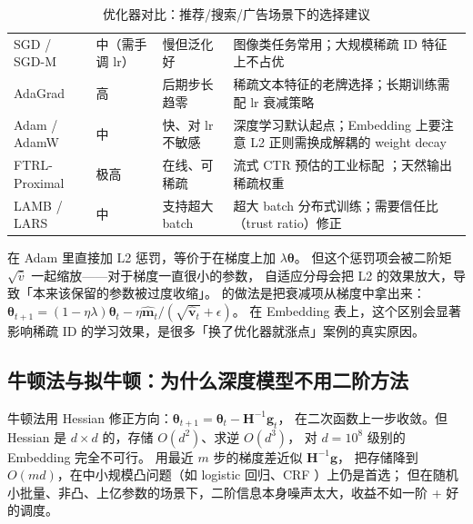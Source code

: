 \begin{table}[htbp]
\centering
\caption{优化器对比：推荐/搜索/广告场景下的选择建议}
\label{tab:optimizers}
\small
\begin{tabularx}{\textwidth}{L{2.0cm} L{2.4cm} L{3.0cm} Y}
\toprule
{} &  &  &  \\
\midrule
SGD / SGD-M & 中（需手调 lr） & 慢但泛化好 & 图像类任务常用；大规模稀疏 ID 特征上不占优 \\
\addlinespace
AdaGrad & 高 & 后期步长趋零 & 稀疏文本特征的老牌选择；长期训练需配 lr 衰减策略 \\
\addlinespace
Adam / AdamW & 中 & 快、对 lr 不敏感 & 深度学习默认起点；Embedding 上要注意 L2 正则需换成解耦的 weight decay \\
\addlinespace
FTRL-Proximal & 极高 & 在线、可稀疏 & 流式 CTR 预估的工业标配 \cite{mcmahan2013ftrl}；天然输出稀疏权重 \\
\addlinespace
LAMB / LARS & 中 & 支持超大 batch & 超大 batch 分布式训练；需要信任比（trust ratio）修正 \\
\bottomrule
\end{tabularx}
\end{table}

\begin{insight}
在 Adam 里直接加 L2 惩罚，等价于在梯度上加 $\lambda\bm{\theta}$。
但这个惩罚项会被二阶矩 $\sqrt{\hat{v}}$ 一起缩放——对于梯度一直很小的参数，
自适应分母会把 L2 的效果放大，导致「本来该保留的参数被过度收缩」。
 的做法是把衰减项从梯度中拿出来：
$\bm{\theta}_{t+1} = (1-\eta\lambda)\bm{\theta}_t - \eta \hat{\bm{m}}_t/(\sqrt{\hat{\bm{v}}_t}+\epsilon)$。
在 Embedding 表上，这个区别会显著影响稀疏 ID 的学习效果，是很多「换了优化器就涨点」案例的真实原因。
\end{insight}

\subsection{牛顿法与拟牛顿：为什么深度模型不用二阶方法}

牛顿法用 Hessian 修正方向：$\bm{\theta}_{t+1} = \bm{\theta}_t - \bm{H}^{-1}\bm{g}_t$，
在二次函数上一步收敛。但 Hessian 是 $d \times d$ 的，存储 $O(d^2)$、求逆 $O(d^3)$，
对 $d = 10^8$ 级别的 Embedding 完全不可行。
 用最近 $m$ 步的梯度差近似 $\bm{H}^{-1}\bm{g}$，
把存储降到 $O(md)$，在中小规模凸问题（如 logistic 回归、CRF \cite{lafferty2001crf}）上仍是首选；
但在随机小批量、非凸、上亿参数的场景下，二阶信息本身噪声太大，收益不如一阶 + 好的调度。

